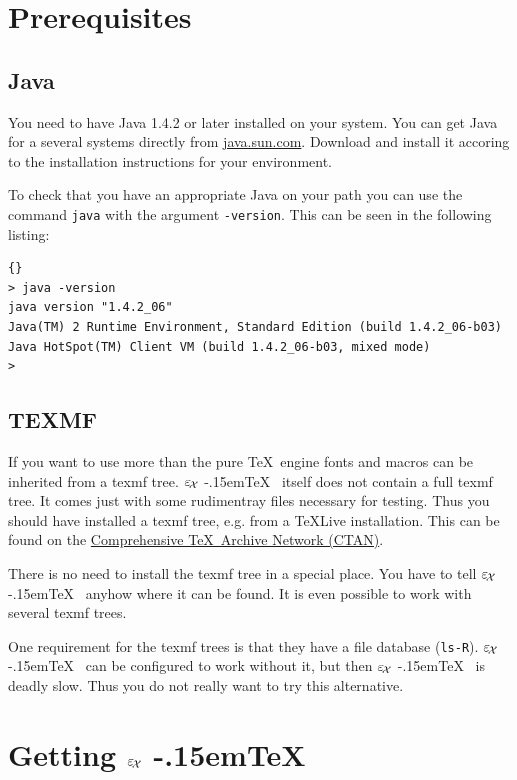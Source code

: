 \documentclass[12pt,div12,a4paper]{scrbook}
\providecommand*{\ExTeX}{\ifx\texorpdfstring\undefined
  \textrm{%
    \ensuremath{\textstyle\varepsilon_{\kern-0.15em\mathcal{X}}}%
    \kern-.15em\TeX}%
  \else\texorpdfstring{%
  \textrm{%
    \ensuremath{\textstyle\varepsilon_{\kern-0.15em\mathcal{X}}}%
    \kern-.15em\TeX
  }}{ExTeX}%
  \fi
}
\begin{document}
\section{Prerequisites}

\subsection{Java}

You need to have Java 1.4.2 or later installed on your system. You can
get Java for a several systems directly from \url{java.sun.com}.
Download and install it accoring to the installation instructions for
your environment.

To check that you have an appropriate Java on your path you can use
the command \texttt{java} with the argument \texttt{-version}. This
can be seen in the following listing:

\begin{lstlisting}{}
> java -version
java version "1.4.2_06"
Java(TM) 2 Runtime Environment, Standard Edition (build 1.4.2_06-b03)
Java HotSpot(TM) Client VM (build 1.4.2_06-b03, mixed mode)
>
\end{lstlisting}


\subsection{TEXMF}

If you want to use more than the pure \TeX\ engine fonts and macros
can be inherited from a texmf tree. \ExTeX\ itself does not contain a
full texmf tree. It comes just with some rudimentray files necessary
for testing. Thus you should have installed a texmf tree, e.g. from a
\TeX Live installation. This can be found on the
\href{http://www.ctan.org}{Comprehensive \TeX\ Archive Network (CTAN)}.

There is no need to install the texmf tree in a special place. You
have to tell \ExTeX\ anyhow where it can be found. It is even possible
to work with several texmf trees.

One requirement for the texmf trees is that they have a file database
(\texttt{ls-R}). \ExTeX\ can be configured to work without it, but
then \ExTeX\ is deadly slow. Thus you do not really want to try this
alternative.


\section{Getting \ExTeX}
\end{document}

